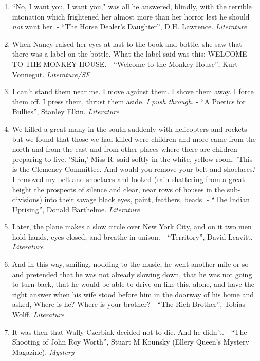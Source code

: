 \documentclass[11pt]{article}
\begin{document}
\begin{enumerate}
\item ``No, I want you, I want you," was all he answered, blindly, with the
terrible intonation which frightened her almost more than her horror lest
he should \textit{not} want her. - ``The Horse Dealer's Daughter'', D.H. Lawrence. \textit{Literature}

\item When Nancy raised her eyes at last to the book and bottle, she saw that
there was a label on the bottle. What the label said was this: WELCOME TO
THE MONKEY HOUSE. - ``Welcome to the Monkey House'', Kurt Vonnegut. \textit{Literature/SF}


\item I can't stand them near me. I move against them. I shove them away. I force
them off. I press them, thrust them aside. \textit{I push through}. - ``A Poetics for Bullies'',  Stanley Elkin. \textit{Literature}

\item We killed a great many in the south suddenly with helicopters and rockets
but we found that those we had killed were children and more came from the
north and from the east and from other places where there are children
preparing to live. 'Skin,' Miss R. said softly in the white, yellow room.
'This is the Clemency Committee. And would you remove your belt and
shoelaces.' I removed my belt and shoelaces and looked (rain shattering
from a great height the prospects of silence and clear, near rows of houses
in the sub-divisions) into their savage black eyes, paint, feathers, beads. - ``The Indian Uprising'', Donald Barthelme. \textit{Literature}

\item Later, the plane makes a slow circle over New York City, and on it two men
hold hands, eyes closed, and breathe in unison. - ``Territory'', David Leavitt.
 \textit{Literature}

\item And in this way, smiling, nodding to the music, he went another mile or so
and pretended that he was not already slowing down, that he was not going
to turn back, that he would be able to drive on like this, alone, and have
the right answer when his wife stood before him in the doorway of his home
and asked, Where is he? Where is your brother? - ``The Rich Brother'', Tobias Wolff. \textit{Literature}

\item It was then that Wally Czerbiak decided not to die. And he didn't. - ``The Shooting of John Roy Worth'', Stuart M Kounsky (Ellery Queen's Mystery Magazine). \textit{Mystery}



\end{enumerate}
\end{document}
